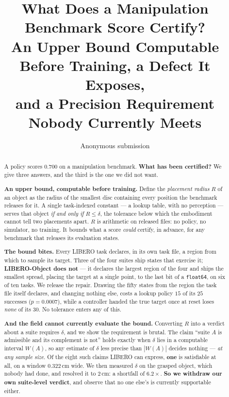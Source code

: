 \documentclass[10pt,twocolumn]{article}
\title{\textbf{What Does a Manipulation Benchmark Score Certify?\\[2pt]
\large An Upper Bound Computable Before Training, a Defect It Exposes,\\
and a Precision Requirement Nobody Currently Meets}}
\author{Anonymous submission}
\date{}
\begin{document}
\maketitle

\begin{abstract}
\noindent
A policy scores $0.700$ on a manipulation benchmark. \textbf{What has been
certified?} We give three answers, and the third is the one we did not want.

\textbf{An upper bound, computable before training.} Define the
\emph{placement radius} $R$ of an object as the radius of the smallest disc
containing every position the benchmark releases for it. A single task-indexed
constant --- a lookup table, with no perception --- serves that object
\emph{if and only if} $R \le \delta$, the tolerance below which the embodiment
cannot tell two placements apart. $R$ is arithmetic on released files: no
policy, no simulator, no training. It bounds what a score \emph{could}
certify, in advance, for any benchmark that releases its evaluation states.

\textbf{The bound bites.} Every LIBERO task declares, in its own task file, a
region from which to sample its target. Three of the four suites ship states
that exercise it; \textbf{LIBERO-Object does not} --- it declares the largest
region of the four and ships the smallest spread, placing the target at a
single point, to the last bit of a \texttt{float64}, on six of ten tasks. We
release the repair. Drawing the fifty states from the
region the task file itself declares, and changing nothing else, costs a
lookup policy $15$ of its $25$ successes ($p = 0.0007$), while a controller
handed the true target once at reset loses \emph{none} of its $30$. No
tolerance enters any of this.

\textbf{And the field cannot currently evaluate the bound.} Converting $R$ into
a verdict about a suite requires $\delta$, and we show the requirement is
brutal. The claim ``suite $A$ is admissible and its complement is not'' holds
exactly when $\delta$ lies in a computable interval $W(A)$, so any estimate of
$\delta$ less precise than $|W(A)|$ decides nothing --- \emph{at any sample
size}. Of the eight such claims LIBERO can express, \textbf{one} is satisfiable
at all, on a window $0.322$\,cm wide. We then measured $\delta$ on the grasped
object, which nobody had done, and resolved it to $2$\,cm: a shortfall of
$6.2\times$. \textbf{So we withdraw our own suite-level verdict}, and observe
that no one else's is currently supportable either.


\end{abstract}
\end{document}
